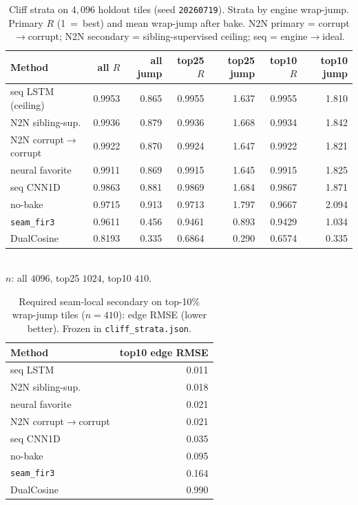 \begin{table}[t]
  \centering
  \caption{Cliff strata on $4{,}096$ holdout tiles (seed \texttt{20260719}).
  Strata by engine wrap-jump. Primary $R$ (1~=~best) and mean wrap-jump after bake.
  N2N primary = corrupt$\to$corrupt; N2N secondary = sibling-supervised ceiling; seq = engine$\to$ideal.}
  \label{tab:cliff-strata}
  \setlength{\tabcolsep}{2.5pt}
  \begin{tabular}{@{}lrrrrrr@{}}
    \toprule
    Method & all $R$ & all jump & top25 $R$ & top25 jump & top10 $R$ & top10 jump \\
    \midrule
    seq LSTM (ceiling) & 0.9953 & 0.865 & 0.9955 & 1.637 & 0.9955 & 1.810 \\
    N2N sibling-sup. & 0.9936 & 0.879 & 0.9936 & 1.668 & 0.9934 & 1.842 \\
    N2N corrupt$\to$corrupt & 0.9922 & 0.870 & 0.9924 & 1.647 & 0.9922 & 1.821 \\
    neural favorite & 0.9911 & 0.869 & 0.9915 & 1.645 & 0.9915 & 1.825 \\
    seq CNN1D & 0.9863 & 0.881 & 0.9869 & 1.684 & 0.9867 & 1.871 \\
    no-bake & 0.9715 & 0.913 & 0.9713 & 1.797 & 0.9667 & 2.094 \\
    \texttt{seam\_fir3} & 0.9611 & 0.456 & 0.9461 & 0.893 & 0.9429 & 1.034 \\
    DualCosine & 0.8193 & 0.335 & 0.6864 & 0.290 & 0.6574 & 0.335 \\
    \bottomrule
  \end{tabular}\\[0.3em]
  {\footnotesize $n$: all $4096$, top25 $1024$, top10 $410$.}
\end{table}

\begin{table}[t]
  \centering
  \caption{Required seam-local secondary on top-10\% wrap-jump tiles ($n{=}410$): edge RMSE (lower better). Frozen in \texttt{cliff\_strata.json}.}
  \label{tab:cliff-edge-rmse}
  \setlength{\tabcolsep}{3pt}
  \begin{tabular}{@{}lr@{}}
    \toprule
    Method & top10 edge RMSE \\
    \midrule
    seq LSTM & 0.011 \\
    N2N sibling-sup. & 0.018 \\
    neural favorite & 0.021 \\
    N2N corrupt$\to$corrupt & 0.021 \\
    seq CNN1D & 0.035 \\
    no-bake & 0.095 \\
    \texttt{seam\_fir3} & 0.164 \\
    DualCosine & 0.990 \\
    \bottomrule
  \end{tabular}
\end{table}

